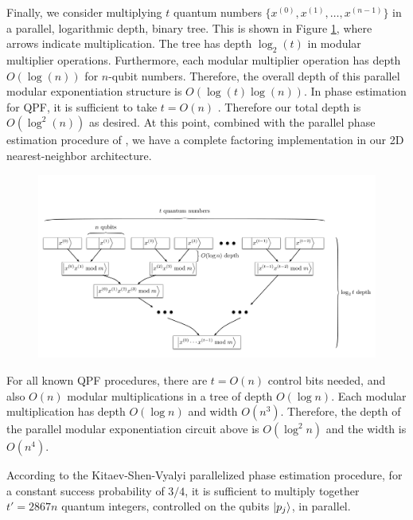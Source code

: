 \documentclass[twoside]{article}
\begin{document}
Finally, we consider multiplying $t$ quantum numbers
$\{x^{(0)}, x^{(1)}, \ldots, x^{(n-1)}\}$ in a parallel,
logarithmic depth, binary tree.
This is shown in Figure \ref{fig:modexp-qq-parallel}, where arrows indicate multiplication.
The tree has depth $\log_2(t)$ in modular multiplier operations. Furthermore,
each
modular multiplier operation has depth $O(\log(n))$ for $n$-qubit
numbers. Therefore, the overall depth of this parallel modular exponentiation
structure is $O(\log(t)\log(n))$. In phase estimation for QPF, it is
sufficient to take $t = O(n)$ \cite{Nielsen2000,Kitaev2002}. Therefore our total depth is
$O(\log^2(n))$ as desired. At this point, combined with the parallel phase
estimation procedure of \cite{Kitaev2002}, we have a complete factoring
implementation in our 2D nearest-neighbor architecture.
%
\begin{figure}[tb!]
\centerline{
\includegraphics[width=5.5in]{./mod-exp-par.pdf}
}
\label{fig:modexp-qq-parallel}
\end{figure}

For all known QPF procedures, there are $t=O(n)$ control bits needed, and
also $O(n)$ modular multiplications in a tree of depth $O(\log n)$.
Each modular multiplication has
depth $O(\log n)$ and width $O(n^3)$.
Therefore, the depth of the parallel modular exponentiation circuit above
is $O(\log^2 n)$ and the width is $O(n^4)$.

According to the Kitaev-Shen-Vyalyi parallelized phase estimation procedure,
for a constant success probability of $3/4$,
it is sufficient to multiply together $t' = 2867n$ quantum integers,
controlled on the qubits $\left\vert{p_j}\right\rangle$, in parallel.
\end{document}
